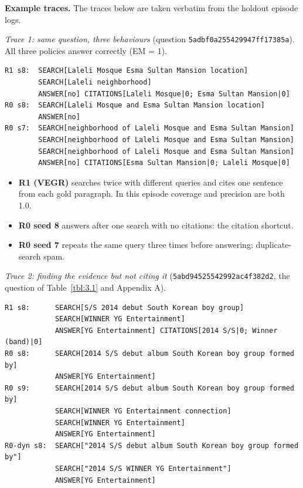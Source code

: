\textbf{Example traces.} The traces below are taken verbatim from the
holdout episode logs.

\emph{Trace 1: same question, three behaviours} (question
\texttt{5adb\allowbreak{}f0a2\allowbreak{}5542\allowbreak{}9947\allowbreak{}ff17\allowbreak{}385a\allowbreak{}}).
All three policies answer correctly (EM = 1).

\begin{Verbatim}
R1 s8:  SEARCH[Laleli Mosque Esma Sultan Mansion location]
        SEARCH[Laleli neighborhood]
        ANSWER[no] CITATIONS[Laleli Mosque|0; Esma Sultan Mansion|0]
R0 s8:  SEARCH[Laleli Mosque and Esma Sultan Mansion location]
        ANSWER[no]
R0 s7:  SEARCH[neighborhood of Laleli Mosque and Esma Sultan Mansion]
        SEARCH[neighborhood of Laleli Mosque and Esma Sultan Mansion]
        SEARCH[neighborhood of Laleli Mosque and Esma Sultan Mansion]
        ANSWER[no] CITATIONS[Esma Sultan Mansion|0; Laleli Mosque|0]
\end{Verbatim}

\begin{itemize}
\tightlist
\item
  \textbf{R1 (VEGR)} searches twice with different queries and cites one
  sentence from each gold paragraph. In this episode coverage and
  precision are both 1.0.
\item
  \textbf{R0 seed 8} answers after one search with no citations: the
  citation shortcut.
\item
  \textbf{R0 seed 7} repeats the same query three times before
  answering: duplicate-search spam.
\end{itemize}

\emph{Trace 2: finding the evidence but not citing it}
(\texttt{5abd\allowbreak{}9452\allowbreak{}5542\allowbreak{}992a\allowbreak{}c4f3\allowbreak{}82d2\allowbreak{}},
the question of Table~\ref{tbl:3.1} and Appendix A).

\begin{Verbatim}
R1 s8:      SEARCH[S/S 2014 debut South Korean boy group]
            SEARCH[WINNER YG Entertainment]
            ANSWER[YG Entertainment] CITATIONS[2014 S/S|0; Winner (band)|0]
R0 s8:      SEARCH[2014 S/S debut album South Korean boy group formed by]
            ANSWER[YG Entertainment]
R0 s9:      SEARCH[2014 S/S debut album South Korean boy group formed by]
            SEARCH[WINNER YG Entertainment connection]
            SEARCH[WINNER YG Entertainment]
            ANSWER[YG Entertainment]
R0-dyn s8:  SEARCH["2014 S/S debut album South Korean boy group formed by"]
            SEARCH["2014 S/S WINNER YG Entertainment"]
            ANSWER[YG Entertainment]
\end{Verbatim}

